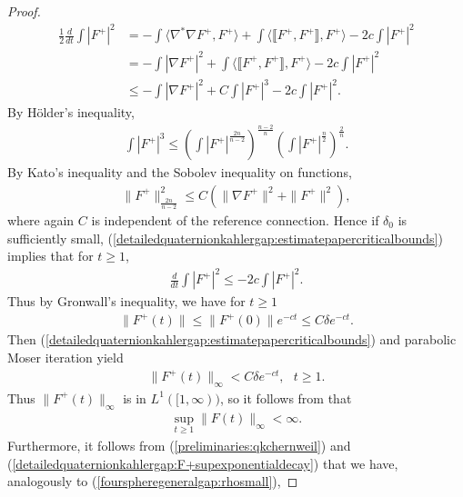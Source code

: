 \documentclass[12pt]{amsart}
\renewcommand{\1}{{\mathbf 1}}
\theoremstyle{others}
\numberwithin{equation}{section}
\begin{document}
\begin{proof}
    \begin{align*}
        \frac{1}{2}\frac{d}{dt} \int |F^+|^2 &= -\int \langle \nabla^\ast \nabla  F^+, F^+\rangle + \int \langle \llbracket F^+, F^+\rrbracket, F^+\rangle - 2c \int |F^+|^2 \\
        &=  -\int| \nabla  F^+|^2 + \int \langle \llbracket F^+, F^+\rrbracket, F^+\rangle - 2c \int |F^+|^2 \\
        &\leq -\int| \nabla  F^+|^2 + C\int |F^+|^3 - 2c\int |F^+|^2.
    \end{align*} By H{\"o}lder's inequality,
    \begin{align*}
        \int |F^+|^3 \leq \left(\int |F^+|^{\frac{2n}{n-2}}\right)^{\frac{n-2}{n}}\left(\int |F^+|^{\frac{n}{2}}\right)^{\frac{2}{n}}.
    \end{align*}By Kato's inequality and the Sobolev inequality on functions,
    \begin{align*}
       \|F^+\|_{\frac{2n}{n-2}}^2 \leq C(\|\nabla F^+\|^2 + \|F^+\|^2),
    \end{align*} where again \(C\) is independent of the reference connection. Hence if \(\delta_0\) is sufficiently small, (\ref{detailedquaternionkahlergap:estimatepapercriticalbounds}) implies that for \(t \geq 1\),
    \begin{align*}
        \frac{d}{dt} \int |F^+|^2 \leq -2c \int |F^+|^2.
    \end{align*} Thus by Gronwall's inequality, we have for \(t \geq 1\)
    \begin{align}\label{detailedquaternionkahlergap:F+energyexponentialdecay}
        \|F^+(t)\| \leq \|F^+(0)\|e^{-ct} \leq C\delta e^{-ct}.
    \end{align}  Then  (\ref{detailedquaternionkahlergap:estimatepapercriticalbounds}) and parabolic Moser iteration yield 
    \begin{align}\label{detailedquaternionkahlergap:F+supexponentialdecay}
        \|F^+(t)\|_\infty < C\delta e^{-ct}, \ \ \ t \geq 1.
    \end{align} Thus \(\|F^+(t)\|_\infty\) is in \(L^1([1, \infty))\), so it follows from \cite[Cor. 7.3]{oliveirawaldron} that
    \begin{align}\label{detailedquaternionkahlergap:Fsupbound}
       \sup_{t \geq 1} \|F(t)\|_\infty < \infty. 
    \end{align} Furthermore, it follows from (\ref{preliminaries:qkchernweil}) and (\ref{detailedquaternionkahlergap:F+supexponentialdecay}) that we have, analogously to (\ref{fourspheregeneralgap:rhosmall}),

\end{proof}
\end{document}
